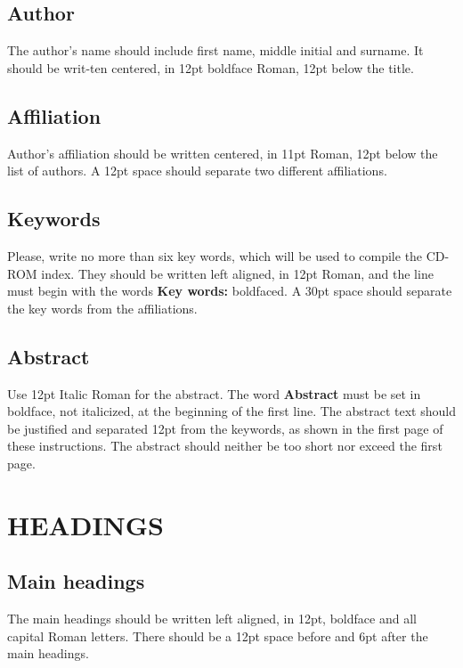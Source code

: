 \documentclass{uncecomp2019}
\begin{document}
\subsection{Author}

The author's name should include first name, middle initial and surname. It
should be writ-ten centered, in 12pt boldface Roman, 12pt below the title.

\subsection{Affiliation}

Author's affiliation should be written centered, in 11pt Roman, 12pt below
the list of authors. A 12pt space should separate two different affiliations.

\subsection{Keywords}

Please, write no more than six key words, which will be used to compile the
CD-ROM index. They should be written left aligned, in 12pt Roman, and the line
must begin with the words \textbf{Key words:} boldfaced. A 30pt space should
separate the key words from the affiliations.

\subsection{Abstract}

Use 12pt Italic Roman for the abstract. The word \textbf{Abstract} must be set
in boldface, not italicized, at the beginning of the first line. The abstract
text should be justified and separated 12pt from the keywords, as shown in the
first page of these instructions. The abstract should neither be too short nor
exceed the first page.

\section{HEADINGS}

\subsection{Main headings}

The main headings should be written left aligned, in 12pt, boldface and all
capital Roman letters. There should be a 12pt space before and 6pt after the
main headings.
\end{document}
